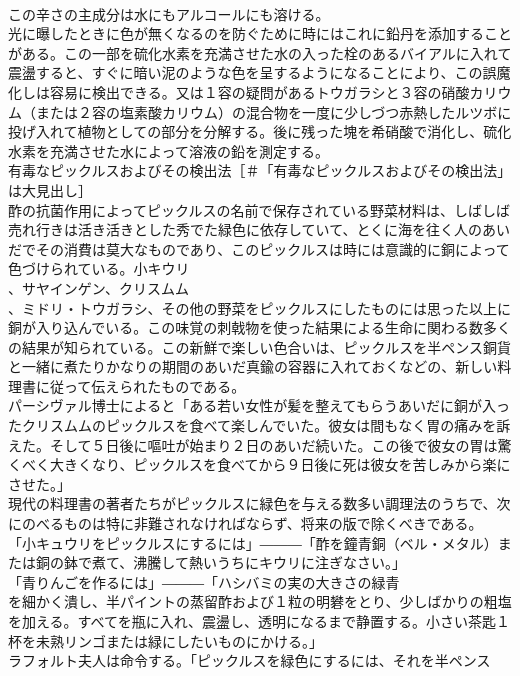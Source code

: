 \documentclass[8pt]{extreport}
\begin{document}
\begin{CJK}{UTF8}{min}
\\	この辛さの主成分は水にもアルコールにも溶ける。
\\	光に曝したときに色が無くなるのを防ぐために時にはこれに鉛丹を添加することがある。この一部を硫化水素を充満させた水の入った栓のあるバイアルに入れて震盪すると、すぐに暗い泥のような色を呈するようになることにより、この誤魔化しは容易に検出できる。又は１容の疑問があるトウガラシと３容の硝酸カリウム（または２容の塩素酸カリウム）の混合物を一度に少しづつ赤熱したルツボに投げ入れて植物としての部分を分解する。後に残った塊を希硝酸で消化し、硫化水素を充満させた水によって溶液の鉛を測定する。
\\	有毒なピックルスおよびその検出法［＃「有毒なピックルスおよびその検出法」は大見出し］
\\	酢の抗菌作用によってピックルスの名前で保存されている野菜材料は、しばしば売れ行きは活き活きとした秀でた緑色に依存していて、とくに海を往く人のあいだでその消費は莫大なものであり、このピックルスは時には意識的に銅によって色づけられている。小キウリ
\\	、サヤインゲン、クリスムム
\\	、ミドリ・トウガラシ、その他の野菜をピックルスにしたものには思った以上に銅が入り込んでいる。この味覚の刺戟物を使った結果による生命に関わる数多くの結果が知られている。この新鮮で楽しい色合いは、ピックルスを半ペンス銅貨と一緒に煮たりかなりの期間のあいだ真鍮の容器に入れておくなどの、新しい料理書に従って伝えられたものである。
\\	パーシヴァル博士によると「ある若い女性が髪を整えてもらうあいだに銅が入ったクリスムムのピックルスを食べて楽しんでいた。彼女は間もなく胃の痛みを訴えた。そして５日後に嘔吐が始まり２日のあいだ続いた。この後で彼女の胃は驚くべく大きくなり、ピックルスを食べてから９日後に死は彼女を苦しみから楽にさせた。」
\\	現代の料理書の著者たちがピックルスに緑色を与える数多い調理法のうちで、次にのべるものは特に非難されなければならず、将来の版で除くべきである。
\\	「小キュウリをピックルスにするには」―――「酢を鐘青銅（ベル・メタル）または銅の鉢で煮て、沸騰して熱いうちにキウリに注ぎなさい。」
\\	「青りんごを作るには」―――「ハシバミの実の大きさの緑青
\\	を細かく潰し、半パイントの蒸留酢および１粒の明礬をとり、少しばかりの粗塩
\\	を加える。すべてを瓶に入れ、震盪し、透明になるまで静置する。小さい茶匙１杯を未熟リンゴまたは緑にしたいものにかける。」
\\	ラフォルト夫人は命令する。「ピックルスを緑色にするには、それを半ペンス

\end{CJK}
\end{document}
